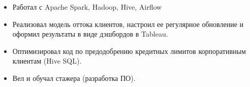 \begin{itemize}
    \item Работал с Apache Spark, Hadoop, Hive, Airflow
    \item Реализовал модель оттока клиентов, настроил ее регулярное обновление и оформил результаты в виде дэшбордов в Tableau.
    \item Оптимизировал код по предодобрению кредитных лимитов корпоративным клиентам (Hive SQL).
    \item Вел и обучал стажера (разработка ПО).
\end{itemize}
